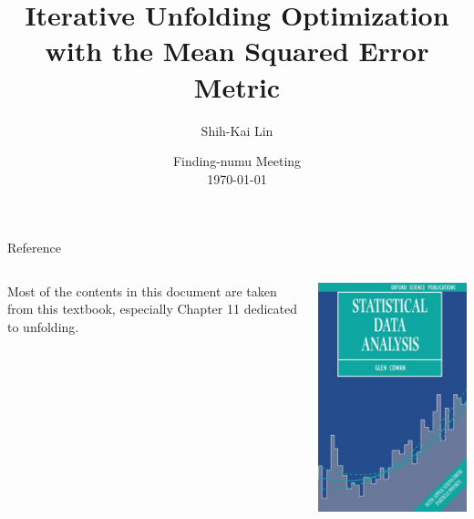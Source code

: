\documentclass[aspectratio=169]{beamer}
\title{Iterative Unfolding Optimization with the Mean Squared Error Metric}
\date[today]{Finding-numu Meeting\\ \today}
\author{Shih-Kai Lin}
\institute{Colorado State University}
\begin{document}
\begin{frame}
\titlepage
\end{frame}

\begin{frame}{Reference}
  \begin{columns}
    \begin{column}{.5\textwidth}
      Most of the contents in this document are taken from this textbook, especially Chapter 11 dedicated to unfolding.
    \end{column}
    \begin{column}{.5\textwidth}
      \centering
      \includegraphics[height=\textheight]{figures/cowan_front_cover.jpeg}
    \end{column}
  \end{columns}
\end{frame}
\end{document}
